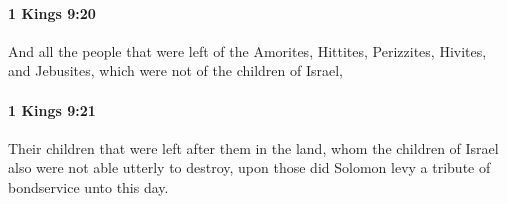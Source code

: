 		\paragraph{1 Kings 9:20} %
			\label{1KINGS-9-20}

			And all the people that were left of the Amorites, Hittites, Perizzites, Hivites, and Jebusites, which were not of the children of Israel,


		\paragraph{1 Kings 9:21} %
			\label{1KINGS-9-21}

			Their children that were left after them in the land, whom the children of Israel also were not able utterly to destroy, upon those did Solomon levy a tribute of bondservice unto this day.


